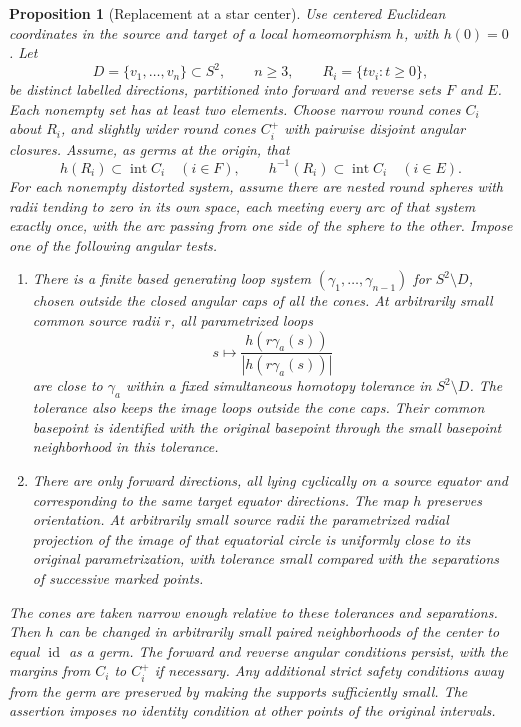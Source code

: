 \documentclass[11pt]{article}
\numberwithin{equation}{section}
\newtheorem{proposition}[theorem]{Proposition}
\theoremstyle{definition}
\theoremstyle{remark}
\begin{document}
\begin{proposition}[Replacement at a star center]\label{lt:star-replacement}\label{lt:star}
Use centered Euclidean coordinates in the source and target of a local
homeomorphism $h$, with $h(0)=0$.  Let
\[
 D=\{v_1,\ldots,v_n\}\subset S^2,\qquad n\geq3,
 \qquad R_i=\{t v_i:t\geq0\},
\]
be distinct labelled directions, partitioned into forward and reverse
sets $F$ and $E$.  Each nonempty set has at least two elements.
Choose narrow round cones $C_i$ about $R_i$, and slightly wider round
cones $C_i^+$ with pairwise disjoint angular closures.  Assume, as germs
at the origin, that
\[
 h(R_i)\subset\operatorname{int}C_i\quad(i\in F),
 \qquad h^{-1}(R_i)\subset\operatorname{int}C_i\quad(i\in E).
\]
For each nonempty distorted system, assume there are nested round
spheres with radii tending to zero in its own space, each meeting every
arc of that system exactly once, with the arc passing from one side of
the sphere to the other.  Impose one of the following angular tests.
\begin{enumerate}
\item There is a finite based generating loop system
$(\gamma_1,\ldots,\gamma_{n-1})$ for $S^2\setminus D$, chosen outside
the closed angular caps of all the cones.  At arbitrarily small common
source radii $r$, all parametrized loops
\[
 s\longmapsto \frac{h(r\gamma_a(s))}{|h(r\gamma_a(s))|}
\]
are close to $\gamma_a$ within a fixed simultaneous homotopy tolerance
in $S^2\setminus D$.  The tolerance also keeps the image loops outside
the cone caps.  Their common basepoint is identified with the original
basepoint through the small basepoint neighborhood in this tolerance.
\item There are only forward directions, all lying cyclically on a
source equator and corresponding to the same target equator
directions.  The map $h$ preserves orientation.  At arbitrarily small
source radii the parametrized radial projection of the image of that
equatorial circle is uniformly close to its original parametrization,
with tolerance small compared with the separations of successive
marked points.
\end{enumerate}
The cones are taken narrow enough relative to these tolerances and
separations.  Then $h$ can be changed in arbitrarily small paired
neighborhoods of the center to equal $\operatorname{id}$ as a germ.  The forward and
reverse angular conditions persist, with the margins from $C_i$ to
$C_i^+$ if necessary.  Any additional strict safety conditions away
from the germ are preserved by making the supports sufficiently small.
The assertion imposes no identity condition at other points of the
original intervals.
\end{proposition}
\end{document}
